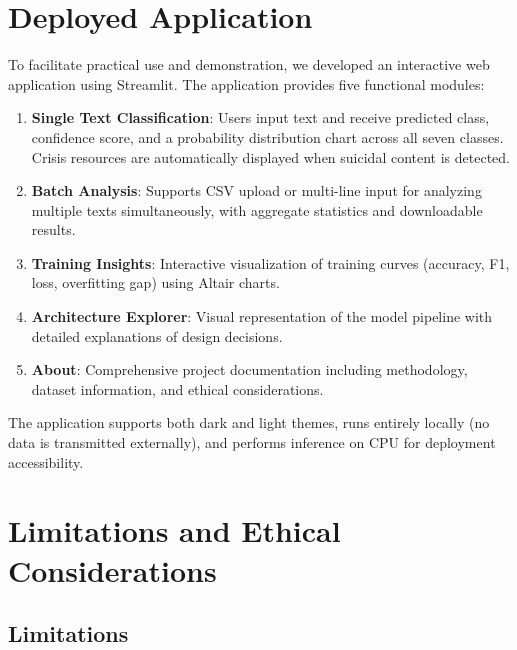 \documentclass[conference, 10pt]{IEEEtran}
\begin{document}
\section{Deployed Application}

To facilitate practical use and demonstration, we developed an interactive web application using Streamlit. The application provides five functional modules:

\begin{enumerate}[noitemsep]
    \item \textbf{Single Text Classification}: Users input text and receive predicted class, confidence score, and a probability distribution chart across all seven classes. Crisis resources are automatically displayed when suicidal content is detected.
    \item \textbf{Batch Analysis}: Supports CSV upload or multi-line input for analyzing multiple texts simultaneously, with aggregate statistics and downloadable results.
    \item \textbf{Training Insights}: Interactive visualization of training curves (accuracy, F1, loss, overfitting gap) using Altair charts.
    \item \textbf{Architecture Explorer}: Visual representation of the model pipeline with detailed explanations of design decisions.
    \item \textbf{About}: Comprehensive project documentation including methodology, dataset information, and ethical considerations.
\end{enumerate}

The application supports both dark and light themes, runs entirely locally (no data is transmitted externally), and performs inference on CPU for deployment accessibility.


\section{Limitations and Ethical Considerations}

\subsection{Limitations}
\end{document}
